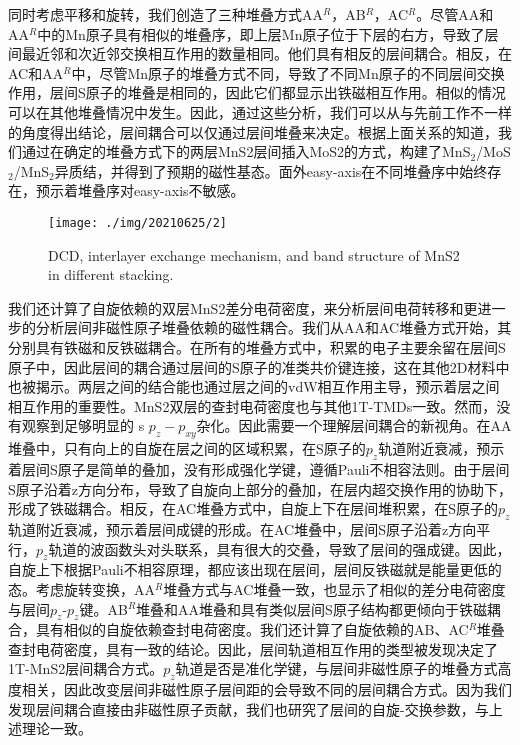\documentclass[reprint, aps, prb, showkeys]{revtex4-2}
\begin{document}
同时考虑平移和旋转，我们创造了三种堆叠方式AA$^R$，AB$^R$，AC$^R$。尽管AA和AA$^R$中的Mn原子具有相似的堆叠序，即上层Mn原子位于下层的右方，导致了层间最近邻和次近邻交换相互作用的数量相同。他们具有相反的层间耦合。相反，在AC和AA$^R$中，尽管Mn原子的堆叠方式不同，导致了不同Mn原子的不同层间交换作用，层间S原子的堆叠是相同的，因此它们都显示出铁磁相互作用。相似的情况可以在其他堆叠情况中发生。因此，通过这些分析，我们可以从与先前工作不一样的角度得出结论，层间耦合可以仅通过层间堆叠来决定。根据上面关系的知道，我们通过在确定的堆叠方式下的两层MnS2层间插入MoS2的方式，构建了MnS$_2$/MoS$_2$/MnS$_2$异质结，并得到了预期的磁性基态。面外easy-axis在不同堆叠序中始终存在，预示着堆叠序对easy-axis不敏感。
\begin{figure*}[t]
    \texttt{[image: ./img/20210625/2]}
    \caption{\label{fig:strain} 
    DCD, interlayer exchange mechanism, and band structure of MnS2 in different stacking.
    }
\end{figure*}
我们还计算了自旋依赖的双层MnS2差分电荷密度，来分析层间电荷转移和更进一步的分析层间非磁性原子堆叠依赖的磁性耦合。我们从AA和AC堆叠方式开始，其分别具有铁磁和反铁磁耦合。在所有的堆叠方式中，积累的电子主要余留在层间S原子中，因此层间的耦合通过层间的S原子的准类共价键连接，这在其他2D材料中也被揭示。两层之间的结合能也通过层之间的vdW相互作用主导，预示着层之间相互作用的重要性。MnS2双层的查封电荷密度也与其他1T-TMDs一致。然而，没有观察到足够明显的 s $p_z - p_{xy}$杂化。因此需要一个理解层间耦合的新视角。在AA堆叠中，只有向上的自旋在层之间的区域积累，在S原子的$p_z$轨道附近衰减，预示着层间S原子是简单的叠加，没有形成强化学键，遵循Pauli不相容法则。由于层间S原子沿着z方向分布，导致了自旋向上部分的叠加，在层内超交换作用的协助下，形成了铁磁耦合。相反，在AC堆叠方式中，自旋上下在层间堆积累，在S原子的$p_z$轨道附近衰减，预示着层间成键的形成。在AC堆叠中，层间S原子沿着z方向平行，$p_z$轨道的波函数头对头联系，具有很大的交叠，导致了层间的强成键。因此，自旋上下根据Pauli不相容原理，都应该出现在层间，层间反铁磁就是能量更低的态。考虑旋转变换，AA$^R$堆叠方式与AC堆叠一致，也显示了相似的差分电荷密度与层间$p_z$-$p_z$键。AB$^R$堆叠和AA堆叠和具有类似层间S原子结构都更倾向于铁磁耦合，具有相似的自旋依赖查封电荷密度。我们还计算了自旋依赖的AB、AC$^R$堆叠查封电荷密度，具有一致的结论。因此，层间轨道相互作用的类型被发现决定了1T-MnS2层间耦合方式。$p_z$轨道是否是准化学键，与层间非磁性原子的堆叠方式高度相关，因此改变层间非磁性原子层间距的会导致不同的层间耦合方式。因为我们发现层间耦合直接由非磁性原子贡献，我们也研究了层间的自旋-交换参数，与上述理论一致。
\end{document}
